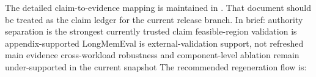 \markdownRendererUlItem {}\markdownRendererUlItemEnd 
\markdownRendererUlEndTight \markdownRendererInterblockSeparator
{}
\markdownRendererSectionEnd \markdownRendererSectionBegin
{}\markdownRendererInterblockSeparator
{}The detailed claim-to-evidence mapping is maintained in .\markdownRendererSoftLineBreak
{}That document should be treated as the claim ledger for the current release branch.\markdownRendererParagraphSeparator
{}In brief:\markdownRendererInterblockSeparator
{}\markdownRendererUlBeginTight
\markdownRendererUlItem authority separation is the strongest currently trusted claim\markdownRendererUlItemEnd 
\markdownRendererUlItem feasible-region validation is appendix-supported\markdownRendererUlItemEnd 
\markdownRendererUlItem LongMemEval is external-validation support, not refreshed main evidence\markdownRendererUlItemEnd 
\markdownRendererUlItem cross-workload robustness and component-level ablation remain under-supported in the current snapshot\markdownRendererUlItemEnd 
\markdownRendererUlEndTight \markdownRendererInterblockSeparator
{}
\markdownRendererSectionEnd \markdownRendererSectionBegin
{}\markdownRendererInterblockSeparator
{}The recommended regeneration flow is:\markdownRendererInterblockSeparator
{}\markdownRendererUlBeginTight
\markdownRendererUlItem {}\markdownRendererUlItemEnd 
\markdownRendererUlItem {}\markdownRendererUlItemEnd 
\markdownRendererUlItem {}\markdownRendererUlItemEnd 
\markdownRendererUlItem {}\markdownRendererUlItemEnd 
